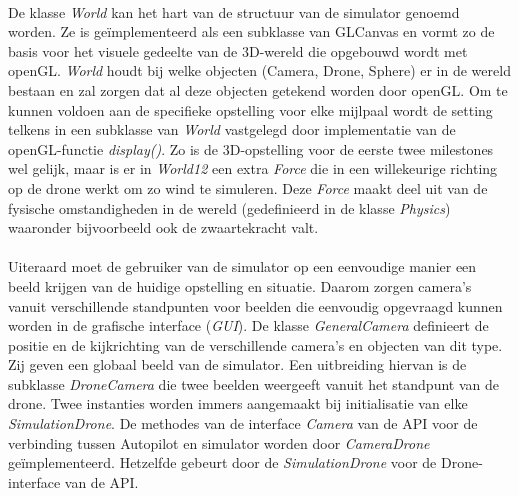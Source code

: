 \\



\noindent
De klasse \textit{World} kan het hart van de structuur van de simulator genoemd worden. Ze is ge\"implementeerd als een subklasse van GLCanvas en vormt zo de basis voor het visuele gedeelte van de 3D-wereld die opgebouwd wordt met openGL. \textit{World} houdt bij welke objecten (Camera, Drone, Sphere) er in de wereld bestaan en zal zorgen dat al deze objecten getekend worden door openGL. Om te kunnen voldoen aan de specifieke opstelling voor elke mijlpaal wordt de setting telkens in een subklasse van \textit{World} vastgelegd door implementatie van de openGL-functie \textit{display()}. Zo is de 3D-opstelling voor de eerste twee milestones wel gelijk, maar is er in \textit{World12} een extra \textit{Force} die in een willekeurige richting op de drone werkt om zo wind te simuleren. Deze \textit{Force} maakt deel uit van de fysische omstandigheden in de wereld (gedefinieerd in de klasse \textit{Physics}) waaronder bijvoorbeeld ook de zwaartekracht valt. \\
~\\
\noindent
Uiteraard moet de gebruiker van de simulator op een eenvoudige manier een beeld krijgen van de huidige opstelling en situatie. Daarom zorgen camera's vanuit verschillende standpunten voor beelden die eenvoudig opgevraagd kunnen worden in de grafische interface (\textit{GUI}). De klasse \textit{GeneralCamera} definieert de positie en de kijkrichting van de verschillende camera's en objecten van dit type. Zij geven een globaal beeld van de simulator. Een uitbreiding hiervan is de subklasse \textit{DroneCamera} die twee beelden weergeeft vanuit het standpunt van de drone. Twee instanties worden immers aangemaakt bij initialisatie van elke \textit{SimulationDrone}. De methodes van de interface \textit{Camera} van de API voor de verbinding tussen Autopilot en simulator worden door \textit{CameraDrone} ge\"implementeerd. Hetzelfde gebeurt door de \textit{SimulationDrone} voor de Drone-interface van de API.